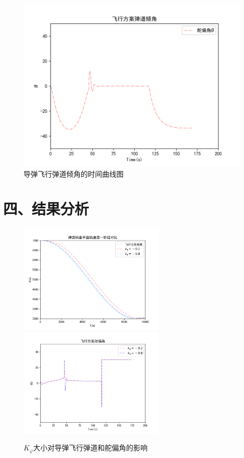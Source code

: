 \documentclass[UTF8]{ctexart}
\begin{document}
\begin{figure}[H]
    \centering
    \includegraphics[width=130mm]{img/飞行弹道倾角.png}
    \caption{导弹飞行弹道倾角的时间曲线图}
\end{figure}

\section*{ 四、结果分析}

\begin{figure}[H]
    \centering
    \includegraphics[width=70mm]{img/飞行轨迹2.png}
    \includegraphics[width=70mm]{img/飞行舵偏角2.png}
    \caption{$K_{\varphi}$大小对导弹飞行弹道和舵偏角的影响}\label{fig:k1}
\end{figure}
\end{document}
